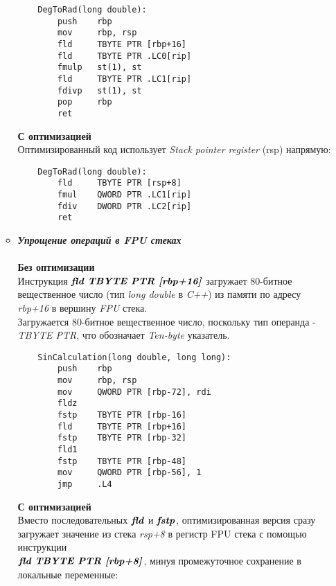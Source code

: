 \documentclass[12pt,a4paper]{article}
\numberwithin{subsection}{section}
\begin{document}
\begin{enumerate}
\begin{itemize}
    \begin{lstlisting}
    DegToRad(long double):
        push    rbp
        mov     rbp, rsp
        fld     TBYTE PTR [rbp+16]
        fld     TBYTE PTR .LC0[rip]
        fmulp   st(1), st
        fld     TBYTE PTR .LC1[rip]
        fdivp   st(1), st
        pop     rbp
        ret
    \end{lstlisting}
    
    \textbf{С оптимизацией}
    \\
    Оптимизированный код использует \textit{Stack pointer register} (rsp) напрямую:

    \begin{lstlisting}
    DegToRad(long double):
        fld     TBYTE PTR [rsp+8]
        fmul    QWORD PTR .LC1[rip]
        fdiv    DWORD PTR .LC2[rip]
        ret
    \end{lstlisting}

    \item \large\textbf{\textit{Упрощение операций в FPU стеках}}
    \\
    \\
    \normalsize\textbf{Без оптимизации}
    \\
    Инструкция $\textbf{\textit{fld TBYTE PTR [rbp+16]}}$ загружает 80-битное 
    вещественное число (тип \textit{long double} в \textit{C++}) из 
    памяти по адресу \textit{rbp+16} в вершину \textit{FPU} стека.
    \\
    Загружается 80-битное вещественное число, поскольку тип операнда - \textit{TBYTE PTR}, 
    что обозначает \textit{Ten-byte} указатель.

    \begin{lstlisting}
    SinCalculation(long double, long long):
        push    rbp
        mov     rbp, rsp
        mov     QWORD PTR [rbp-72], rdi
        fldz
        fstp    TBYTE PTR [rbp-16]
        fld     TBYTE PTR [rbp+16]
        fstp    TBYTE PTR [rbp-32]
        fld1
        fstp    TBYTE PTR [rbp-48]
        mov     QWORD PTR [rbp-56], 1
        jmp     .L4
    \end{lstlisting}

    \textbf{С оптимизацией}
    \\
    Вместо последовательных $\textbf{\textit{fld}}$ и $\textbf{\textit{fstp}}$, 
    оптимизированная версия сразу загружает 
    значение из стека \textit{rsp+8} в регистр FPU стека с помощью инструкции \\
    $\textbf{\textit{fld TBYTE PTR [rbp+8]}}$, минуя промежуточное сохранение 
    в локальные переменные:


\end{itemize}
\end{enumerate}
\end{document}
